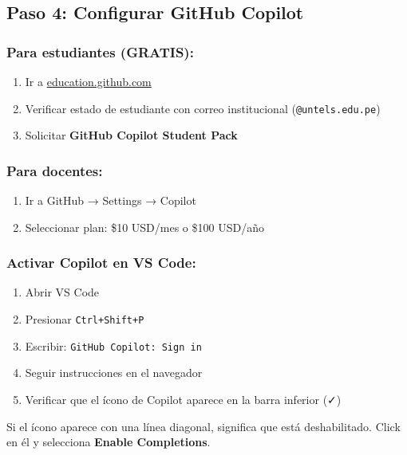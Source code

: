 \documentclass[11pt,a4paper]{article}
\newcommand{\codigo}[1]{\texttt{\textcolor{codigo}{#1}}}
\newcommand{\comando}[1]{\textcolor{azulprofundo}{\texttt{#1}}}
\begin{document}
	\subsection{Paso 4: Configurar GitHub Copilot}
	
	\subsubsection*{Para estudiantes (GRATIS):}
	\begin{enumerate}
		\item Ir a \href{https://education.github.com}{education.github.com}
		\item Verificar estado de estudiante con correo institucional (\codigo{@untels.edu.pe})
		\item Solicitar \textbf{GitHub Copilot Student Pack}
	\end{enumerate}
	
	\subsubsection*{Para docentes:}
	\begin{enumerate}
		\item Ir a GitHub → Settings → Copilot
		\item Seleccionar plan: \$10 USD/mes o \$100 USD/año
	\end{enumerate}
	
	\subsubsection*{Activar Copilot en VS Code:}
	\begin{enumerate}
		\item Abrir VS Code
		\item Presionar \comando{Ctrl+Shift+P}
		\item Escribir: \codigo{GitHub Copilot: Sign in}
		\item Seguir instrucciones en el navegador
		\item Verificar que el ícono de Copilot aparece en la barra inferior (\faCheck)
	\end{enumerate}
	
	\begin{nota}
Si el ícono aparece con una línea diagonal, significa que está deshabilitado. Click en él y selecciona \textbf{Enable Completions}.
	\end{nota}
	
	\newpage
	
\end{document}
